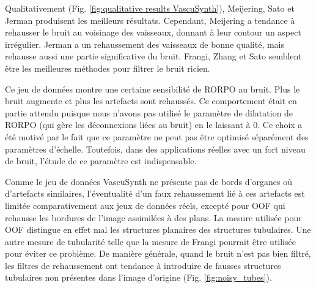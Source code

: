 Qualitativement (Fig. \ref{fig:qualitative results VascuSynth}), Meijering, Sato et Jerman produisent les meilleurs résultats. Cependant, Meijering a tendance à rehausser le bruit au voisinage des vaisseaux, donnant à leur contour un aspect irrégulier. Jerman a un rehaussement des vaisseaux de bonne qualité, mais rehausse aussi une partie significative du bruit. Frangi, Zhang et Sato semblent être les meilleures méthodes pour filtrer le bruit ricien. 

Ce jeu de données montre une certaine sensibilité de RORPO au bruit. Plus le bruit augmente et plus les artefacts sont rehaussés. Ce comportement était en partie attendu puisque nous n'avons pas utilisé le paramètre de dilatation de RORPO (qui gère les déconnexions liées au bruit) en le laissant à 0. Ce choix a été motivé par le fait que ce paramètre ne peut pas être optimisé séparément des paramètres d'échelle. Toutefois, dans des applications réelles avec un fort niveau de bruit, l'étude de ce paramètre est indispensable. 

Comme le jeu de données VascuSynth ne présente pas de bords d'organes où d'artefacts similaires, l'éventualité d'un faux rehaussement lié à ces artefacts est limitée comparativement aux jeux de données réels, excepté pour OOF qui rehausse les bordures de l'image assimilées à des plans. La mesure utilisée pour OOF distingue en effet mal les structures planaires des structures tubulaires. Une autre mesure de tubularité telle que la mesure de Frangi pourrait être utilisée pour éviter ce problème. De manière générale, quand le bruit n'est pas bien filtré, les filtres de rehaussement ont tendance à introduire de fausses structures tubulaires non présentes dans l'image d'origine (Fig. \ref{fig:noisy_tubes}).

